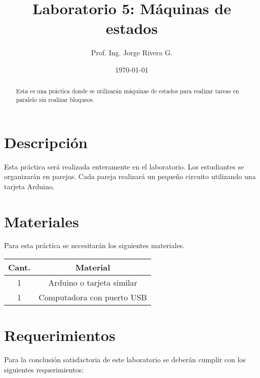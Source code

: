 \documentclass[12pt,letterpaper]{IEEEtran}
\title{Laboratorio 5: M\'aquinas de estados}
\author{Prof. Ing. Jorge Rivera G.}
\date{\today}
\begin{document}

\renewcommand{\leftmark}{UNIVERSIDAD LATINA DE COSTA RICA -- IEC-650 LABORATORIO DE SISTEMAS DIGITALES}

\maketitle


\begin{abstract}
Esta es una práctica donde se utilizarán máquinas de estados para realizar tareas en paralelo sin realizar bloqueos.
\end{abstract}

\section{Descripción}

Esta práctica será realizada enteramente en el laboratorio. Los estudiantes se organizarán en parejas. Cada pareja realizará un pequeño circuito utilizando una tarjeta Arduino.

\section{Materiales}

Para esta práctica se necesitarán los siguientes materiales.

\begin{center}
\begin{tabular}{c|c}\hline
	Cant. & \hspace{2cm}Material\hspace{2cm} \\\hline\hline
	1 	& Arduino o tarjeta similar		\\\hline
	1	& Computadora con puerto USB  	\\\hline	
\end{tabular}
\end{center}

\section{Requerimientos}

Para la conclusión satisfactoria de este laboratorio se deberán cumplir con los siguientes requerimientos:
\end{document}
